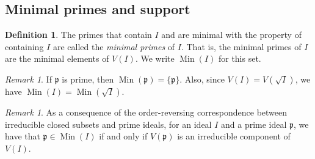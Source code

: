 \documentclass{amsart}[12pt]
\def\Min{\operatorname{Min}}
\newcommand{\p}{{\mathfrak p}}
\numberwithin{equation}{section}
\theoremstyle{plain} %
\theoremstyle{definition}
\newtheorem{definition}[equation]{Definition}
\newtheorem{exer}[equation]{Optional Exercise}
\theoremstyle{remark}
\newtheorem{remark}[equation]{Remark}
\newcommand{\ssec}[1]{\subsection{#1}}
\begin{document}
\ssec{Minimal primes and support}



\begin{definition}
	The primes that contain $I$ and are minimal with the property of containing $I$ are called the {\em minimal primes} of $I$. That is, the minimal primes of $I$ are the minimal elements of $V(I)$. We write $\Min(I)$\index{$\Min(I)$} for this set. 
\end{definition}



\begin{remark}\label{min primes of a prime}
	If $\p$ is prime, then $\Min(\p)=\{\p\}$. Also, since $V(I)=V(\sqrt{I})$, we have $\Min(I)=\Min(\sqrt{I})$.
\end{remark}



\begin{remark} As a consequence of the order-reversing correspondence between irreducible closed subsets and prime ideals, for an ideal $I$ and a prime ideal $\p$, we have that $\p\in \Min(I)$ if and only if $V(\p)$ is an irreducible component of $V(I)$.
\end{remark}
\end{document}
